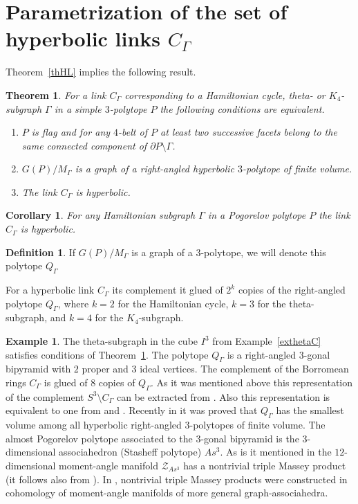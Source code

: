 \documentclass[12pt]{amsart}
\newtheorem{corollary}[formula]{Corollary}
\newtheorem{theorem}[formula]{Theorem}
\theoremstyle{definition}
\newtheorem{definition}[formula]{Definition}
\newtheorem{example}[formula]{Example}
\theoremstyle{remark}
\begin{document}
\section{Parametrization of the set of hyperbolic links $C_\Gamma$}
Theorem~\ref{thHL} implies the following result.
\begin{theorem}\label{thGHL}
For a link $C_\Gamma$ corresponding to a Hamiltonian cycle, theta- or $K_4$-subgraph $\Gamma$
in a simple $3$-polytope $P$ the following conditions are equivalent.
\begin{enumerate}
\item $P$ is flag and for any $4$-belt of $P$ at least two successive facets 
belong to the same connected component of $\partial P\setminus\Gamma$.
\item  $G(P)/M_\Gamma$ is a graph of a right-angled hyperbolic $3$-polytope of finite volume.
\item The link $C_\Gamma$ is hyperbolic.
\end{enumerate}
\end{theorem}
\begin{corollary}
For any Hamiltonian subgraph $\Gamma$ in a Pogorelov polytope $P$ the link $C_\Gamma$ is hyperbolic.
\end{corollary}
\begin{definition}
If $G(P)/M_\Gamma$ is a graph of a $3$-polytope, we will denote this polytope $Q_\Gamma$
\end{definition}
For a hyperbolic link $C_\Gamma$ its complement it glued of $2^k$ copies of the right-angled polytope $Q_\Gamma$,
where $k=2$ for the Hamiltonian cycle, $k=3$ for the theta-subgraph, and $k=4$ for the $K_4$-subgraph.
\begin{example}\label{ex:BorAs}
The theta-subgraph in the cube $I^3$
 from Example~\ref{exthetaC} satisfies conditions of Theorem~\ref{thGHL}. The polytope $Q_\Gamma$ is 
a right-angled $3$-gonal bipyramid with $2$ proper and $3$ ideal vertices.  
The complement of the Borromean rings $C_{\Gamma}$
is glued of $8$ copies of $Q_\Gamma$. 
 As it was mentioned above this representation of the complement $S^3\setminus C_{\Gamma}$ 
can be extracted from \cite[Example 13.1.5]{T02}. Also this representation is equivalent 
to one from \cite[Examples 7 and 9]{MR22} and \cite[Section 1.1.2]{M24}. Recently in \cite{VE25} it was proved that $Q_\Gamma$
has the smallest volume among all hyperbolic right-angled $3$-polytopes of finite volume.
The almost Pogorelov polytope associated to the $3$-gonal bipyramid is the $3$-dimensional
associahedron (Stasheff polytope) $As^3$. As is it mentioned in \cite[Remark after Example 4.9.4]{BP15} the 
$12$-dimensional moment-angle manifold $\mathcal{Z}_{As^3}$ has a nontrivial triple Massey product 
(it follows also from \cite[Theorem 6.1.1]{DS07}). In \cite{L19}, nontrivial triple Massey products were constructed in cohomology
of moment-angle manifolds of more general graph-associahedra. 
\end{example}
\end{document}
